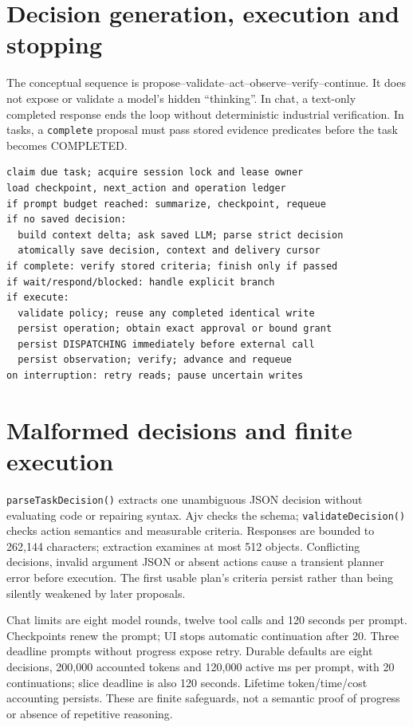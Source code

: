 \section{Decision generation, execution and stopping}
The conceptual sequence is propose--validate--act--observe--verify--continue. It does not expose or validate a model's hidden ``thinking''. In chat, a text-only completed response ends the loop without deterministic industrial verification. In tasks, a \texttt{complete} proposal must pass stored evidence predicates before the task becomes COMPLETED.
\begin{lstlisting}[caption={Source-aligned worker pseudocode (abbreviated).}]
claim due task; acquire session lock and lease owner
load checkpoint, next_action and operation ledger
if prompt budget reached: summarize, checkpoint, requeue
if no saved decision:
  build context delta; ask saved LLM; parse strict decision
  atomically save decision, context and delivery cursor
if complete: verify stored criteria; finish only if passed
if wait/respond/blocked: handle explicit branch
if execute:
  validate policy; reuse any completed identical write
  persist operation; obtain exact approval or bound grant
  persist DISPATCHING immediately before external call
  persist observation; verify; advance and requeue
on interruption: retry reads; pause uncertain writes
\end{lstlisting}
\section{Malformed decisions and finite execution}
\texttt{parseTaskDecision()} extracts one unambiguous JSON decision without evaluating code or repairing syntax. Ajv checks the schema; \texttt{validateDecision()} checks action semantics and measurable criteria. Responses are bounded to 262,144 characters; extraction examines at most 512 objects. Conflicting decisions, invalid argument JSON or absent actions cause a transient planner error before execution. The first usable plan's criteria persist rather than being silently weakened by later proposals.

Chat limits are eight model rounds, twelve tool calls and 120 seconds per prompt. Checkpoints renew the prompt; UI stops automatic continuation after 20. Three deadline prompts without progress expose retry. Durable defaults are eight decisions, 200,000 accounted tokens and 120,000 active ms per prompt, with 20 continuations; slice deadline is also 120 seconds. Lifetime token/time/cost accounting persists. These are finite safeguards, not a semantic proof of progress or absence of repetitive reasoning.
